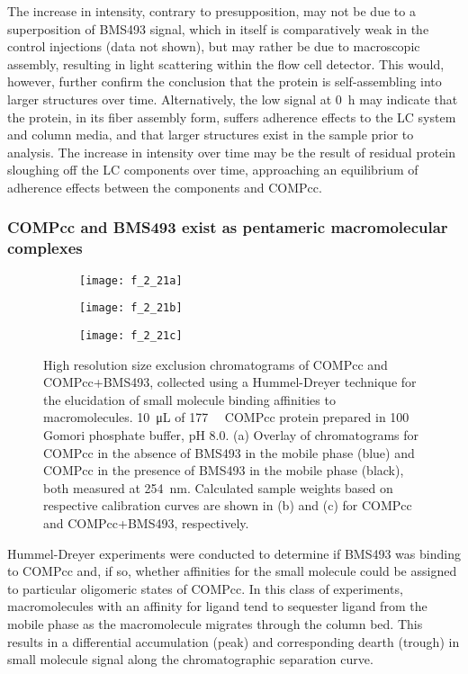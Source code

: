 \begin{refsection}
\label{sec:ze_premature_assembly}
The increase in intensity, contrary to presupposition, may not be due to a
superposition of BMS493 signal, which in itself is comparatively weak in the
control injections (data not shown), but may rather be due to macroscopic
assembly, resulting in light scattering within the flow cell detector. This
would, however, further confirm the conclusion that the protein is
self-assembling into larger structures over time. Alternatively, the low signal
at \SI{0}{\hour} may indicate that the protein, in its fiber assembly form,
suffers adherence effects to the LC system and column media, and that larger
structures exist in the sample prior to analysis. The increase in intensity over
time may be the result of residual protein sloughing off the LC components over
time, approaching an equilibrium of adherence effects between the components and
COMPcc. 

\subsubsection{COMPcc and BMS493 exist as pentameric macromolecular complexes}
\begin{figure}
    \centering
    \begin{subfigure}[b]{0.8\textwidth}
        \texttt{[image: f\_2\_21a]}
        \caption{}
    \end{subfigure}
    \begin{subfigure}[b]{0.4\textwidth}
        \texttt{[image: f\_2\_21b]}
        \caption{}
    \end{subfigure}
    \begin{subfigure}[b]{0.4\textwidth}
        \texttt{[image: f\_2\_21c]}
        \caption{}
    \end{subfigure}
    \caption{
    High resolution size exclusion chromatograms of COMPcc and COMPcc+BMS493,
    collected using a Hummel-Dreyer technique for the elucidation of small
    molecule binding affinities to macromolecules. \SI{10}{\uL} of
    \SI{177}{\micro\moLar} COMPcc protein prepared in \SI{100}{\milli\moLar}
    Gomori phosphate buffer, pH 8.0. (a) Overlay of chromatograms
    for COMPcc in the absence of BMS493 in the mobile phase (blue) and COMPcc in the
    presence of BMS493 in the mobile phase (black), both measured at
    \SI{254}{\nm}. Calculated sample weights based on respective calibration
    curves are shown in (b) and (c) for COMPcc and COMPcc+BMS493, respectively.
    }\label{fig:sec_results}
\end{figure}
Hummel-Dreyer experiments were conducted to determine if BMS493 was binding
to COMPcc and, if so, whether affinities for the small molecule could be assigned
to particular oligomeric states of COMPcc. In this class of
experiments, macromolecules with an affinity for ligand tend to sequester ligand
from the mobile phase as the macromolecule migrates through the column bed. This
results in a differential accumulation (peak) and corresponding dearth (trough)
in small molecule signal along the chromatographic separation curve. 


\end{refsection}
